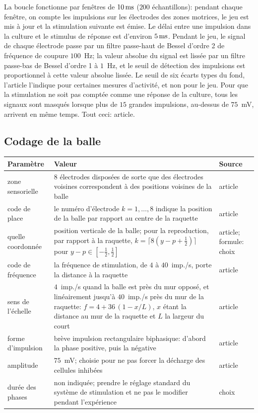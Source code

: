 La boucle fonctionne par fenêtres de $10\,\text{ms}$ ($200$ échantillons): pendant chaque fenêtre, on compte les impulsions sur les électrodes des zones motrices, le jeu est mis à jour et la stimulation suivante est émise. Le délai entre une impulsion dans la culture et le stimulus de réponse est d'environ $5\,\text{ms}$. Pendant le jeu, le signal de chaque électrode passe par un filtre passe-haut de Bessel d'ordre 2 de fréquence de coupure $100$~Hz; la valeur absolue du signal est lissée par un filtre passe-bas de Bessel d'ordre 1 à $1$~Hz, et le seuil de détection des impulsions est proportionnel à cette valeur absolue lissée. Le seuil de six écarts types du fond, l'article l'indique pour certaines mesures d'activité, et non pour le jeu. Pour que la stimulation ne soit pas comptée comme une réponse de la culture, tous les signaux sont masqués lorsque plus de $15$ grandes impulsions, au-dessus de $75$~mV, arrivent en même temps. Tout ceci: article.

\subsection*{Codage de la balle}

\begin{center}
\footnotesize
\setlength{\tabcolsep}{4pt}
\renewcommand{\arraystretch}{1.15}
\begin{tabular}{>{\raggedright}p{3.4cm}>{\raggedright}p{7.5cm}>{\raggedright\arraybackslash}p{1.6cm}}
\toprule
Paramètre & Valeur & Source \\
\midrule
zone sensorielle & $8$ électrodes disposées de sorte que des électrodes voisines correspondent à des positions voisines de la balle & article \\
code de place & le numéro d'électrode $k=1,\dots,8$ indique la position de la balle par rapport au centre de la raquette & article \\
quelle coordonnée & position verticale de la balle; pour la reproduction, par rapport à la raquette, $k=\lceil 8(y-p+\tfrac12)\rceil$ pour $y-p\in[-\tfrac12,\tfrac12]$ & article; formule: choix \\
code de fréquence & la fréquence de stimulation, de $4$ à $40$~imp./s, porte la distance à la raquette & article \\
sens de l'échelle & $4$~imp./s quand la balle est près du mur opposé, et linéairement jusqu'à $40$~imp./s près du mur de la raquette: $f=4+36\,(1-x/L)$, $x$ étant la distance au mur de la raquette et $L$ la largeur du court & article \\
forme d'impulsion & brève impulsion rectangulaire biphasique: d'abord la phase positive, puis la négative & article \\
amplitude & $75$~mV; choisie pour ne pas forcer la décharge des cellules inhibées & article \\
durée des phases & non indiquée; prendre le réglage standard du système de stimulation et ne pas le modifier pendant l'expérience & choix \\
\bottomrule
\end{tabular}
\end{center}

